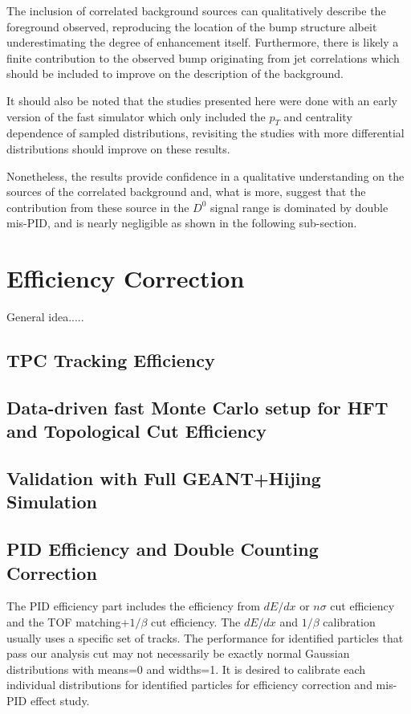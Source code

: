 \documentclass[a4paper]{article}
\begin{document}
The inclusion of correlated background sources can qualitatively describe the foreground observed, reproducing the location of the bump structure albeit underestimating the degree of enhancement itself. Furthermore, there is likely a finite contribution to the observed bump originating from jet correlations which should be included to improve on the description of the background.

It should also be noted that the studies presented here were done with an early version of the fast simulator which only included the $p_T$ and centrality dependence of sampled distributions, revisiting the studies with more differential distributions should improve on these results.

Nonetheless, the results provide confidence in a qualitative understanding on the sources of the correlated background and, what is more, suggest that the contribution from these source in the $D^0$ signal range is dominated by double mis-PID, and is nearly negligible as shown in the following sub-section.


\section{Efficiency Correction}
General idea.....

\subsection{TPC Tracking Efficiency}

\subsection{Data-driven fast Monte Carlo setup for HFT and Topological Cut Efficiency}

\subsection{Validation with Full GEANT+Hijing Simulation}

\subsection{PID Efficiency and Double Counting Correction}

The PID efficiency part includes the efficiency from $dE/dx$ or $n\sigma$ cut efficiency and the TOF matching+$1/\beta$ cut efficiency. The $dE/dx$ and $1/\beta$ calibration usually uses a specific set of tracks. The performance for identified particles that pass our analysis cut may not necessarily be exactly normal Gaussian distributions with means=0 and widths=1. It is desired to calibrate each individual distributions for identified particles for efficiency correction and mis-PID effect study.
\end{document}
